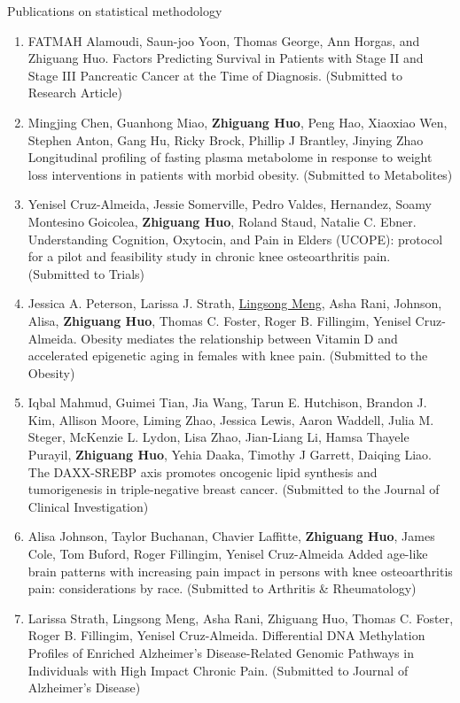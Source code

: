 \documentclass{resume} %
\begin{document}
\begin{rSection}{Publications on statistical methodology}
\begin{enumerate}[noitemsep,topsep=0pt,resume]
\item 
FATMAH Alamoudi, Saun-joo Yoon, Thomas George, Ann Horgas, and Zhiguang Huo.
Factors Predicting Survival in Patients with Stage II and Stage III Pancreatic Cancer at the Time of Diagnosis.
(Submitted to Research Article)


\item 
Mingjing Chen, Guanhong Miao, {\bf Zhiguang Huo}, Peng Hao, Xiaoxiao Wen, Stephen Anton, Gang Hu, Ricky Brock, Phillip J Brantley, Jinying Zhao 
Longitudinal profiling of fasting plasma metabolome in response to weight loss interventions in patients with morbid obesity.
(Submitted to Metabolites)





\item 
Yenisel Cruz-Almeida, Jessie Somerville, Pedro Valdes, Hernandez, Soamy Montesino Goicolea, {\bf Zhiguang Huo}, Roland Staud, Natalie C. Ebner.
Understanding Cognition, Oxytocin, and Pain in Elders (UCOPE): protocol for a pilot and feasibility study in chronic knee osteoarthritis pain. 
(Submitted to Trials)





\item 
Jessica A. Peterson, Larissa J. Strath,  \underline{Lingsong Meng}, Asha Rani, Johnson, Alisa,  {\bf Zhiguang Huo}, Thomas C. Foster, Roger B. Fillingim, Yenisel Cruz-Almeida. 
Obesity mediates the relationship between Vitamin D and accelerated epigenetic aging in females with knee pain.
(Submitted to the Obesity)

\item
Iqbal Mahmud, Guimei Tian, Jia Wang, Tarun E. Hutchison, Brandon J. Kim, Allison Moore, Liming Zhao, Jessica Lewis, Aaron Waddell, Julia M. Steger, McKenzie L. Lydon, Lisa Zhao, Jian-Liang Li, Hamsa Thayele Purayil, {\bf Zhiguang Huo}, Yehia Daaka, Timothy J Garrett, Daiqing Liao.
The DAXX-SREBP axis promotes oncogenic lipid synthesis and tumorigenesis in triple-negative breast cancer.
(Submitted to the Journal of Clinical Investigation)


\item
Alisa Johnson, Taylor Buchanan, Chavier Laffitte, {\bf Zhiguang Huo}, James Cole, Tom Buford, Roger Fillingim, Yenisel Cruz-Almeida
Added age-like brain patterns with increasing pain impact in persons with knee osteoarthritis pain: considerations by race. 
(Submitted to Arthritis \& Rheumatology)


\item
Larissa Strath, Lingsong Meng, Asha Rani, Zhiguang Huo, Thomas C. Foster, Roger B. Fillingim, Yenisel Cruz-Almeida.
Differential DNA Methylation Profiles of Enriched Alzheimer’s Disease-Related Genomic Pathways in Individuals with High Impact Chronic Pain.
(Submitted to Journal of Alzheimer’s Disease)



\end{enumerate}
\end{rSection}
\end{document}
